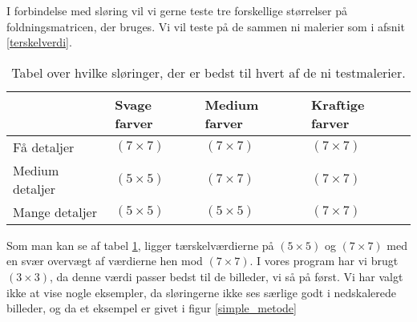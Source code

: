 I forbindelse med sløring vil vi gerne teste tre forskellige størrelser
på foldningsmatricen, der bruges. Vi vil teste
på de sammen ni malerier som i afsnit \ref{terskelverdi}.

\begin{table}[!h]
    \centering
    \begin{tabular}{| l | l | l | l |} \hline
                            & Svage farver	& Medium farver	& Kraftige farver 	\\ \hline
        Få detaljer 		& $(7 \times 7)$	& $(7 \times 7)$	& $(7 \times 7)$		\\ \hline
        Medium detaljer 	& $(5 \times 5)$	& $(7 \times 7)$	& $(7 \times 7)$		\\ \hline
        Mange detaljer		& $(5 \times 5)$	& $(5 \times 5)$	& $(7 \times 7)$		\\ \hline
    \end{tabular}
    \caption{Tabel over hvilke sløringer, der er bedst til hvert af de
	ni testmalerier.}
    \label{sloringTabel}
\end{table}

Som man kan se af tabel \ref{sloringTabel}, ligger tærskelværdierne på
$(5 \times 5)$ og $(7 \times 7)$ med en svær overvægt af værdierne hen
mod $(7 \times 7)$. I vores program har vi brugt $(3 \times 3)$, da denne
værdi passer bedst til de billeder, vi så på først. Vi har valgt ikke at
vise nogle eksempler, da sløringerne ikke ses særlige godt i
nedskalerede billeder, og da et eksempel er givet i figur \ref{simple_metode}
